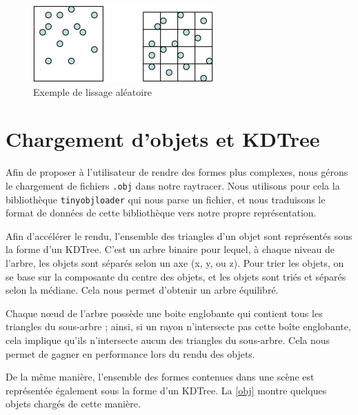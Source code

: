 \documentclass{article}
\begin{document}
\begin{figure}[h]
\begin{center}
  \includegraphics{images/smoothing.png}
  \caption{Exemple de lissage aléatoire\label{smooth}}
\end{center}
\end{figure}


\section{Chargement d'objets et KDTree}

Afin de proposer à l'utilisateur de rendre des formes plus complexes, nous
gérons le chargement de fichiers \texttt{.obj} dans notre raytracer. Nous utilisons
pour cela la bibliothèque \texttt{tinyobjloader} qui nous parse un fichier, et
nous traduisons le format de données de cette bibliothèque vers notre propre
représentation.

Afin d'accélérer le rendu, l'ensemble des triangles d'un objet sont représentés
sous la forme d'un KDTree. C'est un arbre binaire pour lequel, à chaque niveau
de l'arbre, les objets sont séparés selon un axe (x, y, ou z). Pour trier les
objets, on se base sur la composante du centre des objets, et les objets sont
triés et séparés selon la médiane. Cela nous permet d'obtenir un arbre
équilibré.

Chaque nœud de l'arbre possède une boite englobante qui contient tous les
triangles du sous-arbre ; ainsi, si un rayon n'intersecte pas cette boîte
englobante, cela implique qu'ils n'intersecte aucun des triangles du
sous-arbre. Cela nous permet de gagner en performance lors du rendu des objets.

De la même manière, l'ensemble des formes contenues dans une scène est
représentée également sous la forme d'un KDTree. La \cref{obj} montre
quelques objets chargés de cette manière.
\end{document}
